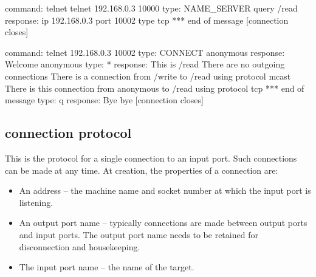 \documentclass[a4]{article}
\begin{document}
\begin{code}
command:  telnet telnet 192.168.0.3 10000
type:     NAME_SERVER query /read
response: ip 192.168.0.3 port 10002 type tcp
          *** end of message
          [connection closes]


command:  telnet 192.168.0.3 10002
type:     CONNECT anonymous
response: Welcome anonymous
type:     *
response: This is /read
          There are no outgoing connections
          There is a connection from /write to /read using protocol mcast
          There is this connection from anonymous to /read using protocol tcp
          *** end of message
type:     q
response: Bye bye
          [connection closes]

\end{code}


\subsection{connection protocol}

This is the protocol for a single connection to an input port.
Such connections can be made at any time.  At creation,
the properties of a connection are:

\begin{itemize}

\item An address -- the machine name and socket number at which
the input port is listening.

\item An output port name -- typically connections are made
between output ports and input ports.  The output port name
needs to be retained for disconnection and housekeeping.

\item The input port name -- the name of the target.

\end{itemize}
\end{document}
